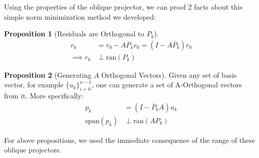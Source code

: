 \documentclass[]{article}
\theoremstyle{definition}
\newtheorem{prop}{Proposition}[section]  %
\begin{document}
            Using the properties of the oblique projector, we can proof 2 facts about this simple norm minimization method we developed: 
            \begin{prop}[Residuals are Orthogonal to $P_k$]
                \begin{align}
                    r_k &= r_0 - A\overline{P}_kr_0 = (I - A\overline{P}_k)r_0
                    \\
                    \implies 
                    r_k &\perp \text{ran}(P_k)
                \end{align}
            \end{prop}
            \begin{prop}[Generating $A$ Orthogonal Vectors]
                Given any set of basis vector, for example $\{u_k\}_{i = 0}^{n - 1}$, one can generate a set of A-Orthogonal vectors from it. More specifically: 
                \begin{align}
                    p_k &= (I - \overline{P}_kA)u_k
                    \\
                    \text{span}(p_k) &\perp \text{ran}(AP_k)
                \end{align}
            \end{prop}
            For above propositions, we used the immediate consequence of the range of these oblique projectors. 
\end{document}
